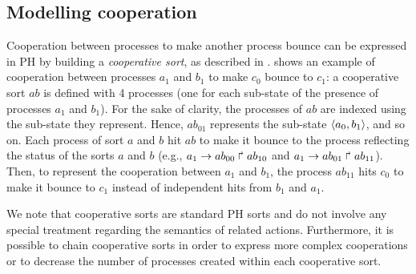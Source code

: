 \subsection{Modelling cooperation}
\label{ssec:cooperation}
Cooperation between processes to make another process bounce can be expressed in PH by building a \emph{cooperative sort}, as described in \cite{PMR10-TCSB}.
 shows an example of cooperation between processes $a_1$ and $b_1$ to make $c_0$ bounce to $c_1$:
a cooperative sort $ab$ is defined with 4 processes (one for each sub-state of the presence of processes $a_1$ and $b_1$).
For the sake of clarity, the processes of $ab$ are indexed using the sub-state they represent.
Hence, $ab_{01}$ represents the sub-state $\mbox{$\langle a_0,b_1 \rangle$}$, and so on.
Each process of sort $a$ and $b$ hit $ab$ to make it bounce to the process reflecting the status of the sorts $a$ and $b$
(e.g., $a_1\rightarrow ab_{00}\Rsh ab_{10}$ and $a_1\rightarrow ab_{01}\Rsh ab_{11}$).
Then, to represent the cooperation between $a_1$ and $b_1$, the process $ab_{11}$ hits $c_0$ to make it bounce to $c_1$ instead of independent hits from $b_1$ and $a_1$.

We note that cooperative sorts are standard PH sorts and do not involve any
special treatment regarding the semantics of related actions.
Furthermore, it is possible to chain cooperative sorts in order to express more complex cooperations
or to decrease the number of processes created within each cooperative sort.

\begin{comment}
When the number of cooperating processes is large, it is possible to chain several cooperative sorts
to prevent the combinatoric explosion of the number of processes created within cooperative sorts.
For instance, if $b_1$, $c_1$, and $d_1$ cooperate, one can create a cooperative sort $bc$ with 4
processes reflecting the presence of $b_1$ and $c_1$, and a cooperative sort $bcd$ with 4 processes
reflecting the presence of $bc_{11}$ and $d_1$.  Such constructions are helpful in PH
as the static analysis of dynamics developed in \cite{PMR12-MSCS} does not suffer from the number of
sorts, but on the number of processes within a single sort.
\end{comment}

